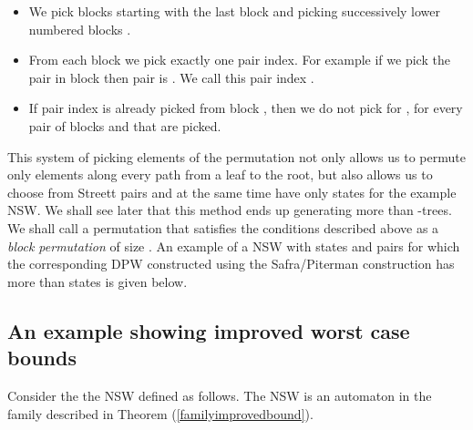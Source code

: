 \documentclass[3p]{elsarticle}
\begin{document}
\begin{itemize}

\item We pick  blocks starting with the last
block  and picking successively lower numbered blocks .

\item From each block we pick exactly one pair index. For example if we pick the
 pair in block  then pair is
. We call this pair index
. 

\item If pair index  is already picked from block , then
we do not pick  for , for every pair of blocks
 and  that are picked. 

\end{itemize}

This system of picking elements of the permutation not only allows us to permute
only  elements along every path from a leaf to the root, but also allows us
to choose from  Streett pairs and at the same time have only  states
for the example NSW. We shall see later that this method ends up generating more
than  -trees. We shall call a permutation that
satisfies the conditions described above as a \emph{block permutation} of size
. An example of a NSW with  states and  pairs for which the
corresponding DPW constructed using the Safra/Piterman construction has more
than  states is given below. 


\subsection{An example showing improved worst case bounds}
\label{familyconstruction}

Consider the the NSW  defined
as follows. The NSW  is an automaton in the family 
described in Theorem (\ref{familyimprovedbound}).
\end{document}
